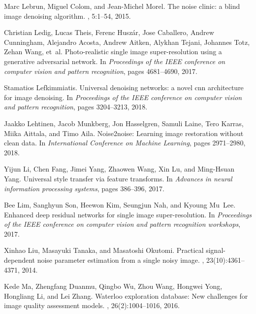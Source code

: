 \documentclass[10pt,twocolumn,letterpaper]{article}
\begin{document}
{\begin{thebibliography}{10}
	Marc Lebrun, Miguel Colom, and Jean-Michel Morel.
	\newblock The noise clinic: a blind image denoising algorithm.
	, 5:1--54, 2015.
	
	Christian Ledig, Lucas Theis, Ferenc Husz{\'a}r, Jose Caballero, Andrew
	Cunningham, Alejandro Acosta, Andrew Aitken, Alykhan Tejani, Johannes Totz,
	Zehan Wang, et~al.
	\newblock Photo-realistic single image super-resolution using a generative
	adversarial network.
	\newblock In {\em Proceedings of the IEEE conference on computer vision and
		pattern recognition}, pages 4681--4690, 2017.
	
	Stamatios Lefkimmiatis.
	\newblock Universal denoising networks: a novel cnn architecture for image
	denoising.
	\newblock In {\em Proceedings of the IEEE conference on computer vision and
		pattern recognition}, pages 3204--3213, 2018.
	
	Jaakko Lehtinen, Jacob Munkberg, Jon Hasselgren, Samuli Laine, Tero Karras,
	Miika Aittala, and Timo Aila.
	\newblock Noise2noise: Learning image restoration without clean data.
	\newblock In {\em International Conference on Machine Learning}, pages
	2971--2980, 2018.
	
	Yijun Li, Chen Fang, Jimei Yang, Zhaowen Wang, Xin Lu, and Ming-Hsuan Yang.
	\newblock Universal style transfer via feature transforms.
	\newblock In {\em Advances in neural information processing systems}, pages
	386--396, 2017.
	
	Bee Lim, Sanghyun Son, Heewon Kim, Seungjun Nah, and Kyoung Mu~Lee.
	\newblock Enhanced deep residual networks for single image super-resolution.
	\newblock In {\em Proceedings of the IEEE conference on computer vision and
		pattern recognition workshops}, 2017.
	
	Xinhao Liu, Masayuki Tanaka, and Masatoshi Okutomi.
	\newblock Practical signal-dependent noise parameter estimation from a single
	noisy image.
	, 23(10):4361--4371, 2014.
	
	Kede Ma, Zhengfang Duanmu, Qingbo Wu, Zhou Wang, Hongwei Yong, Hongliang Li,
	and Lei Zhang.
	\newblock Waterloo exploration database: New challenges for image quality
	assessment models.
	, 26(2):1004--1016, 2016.
	

\end{thebibliography}}
\end{document}
